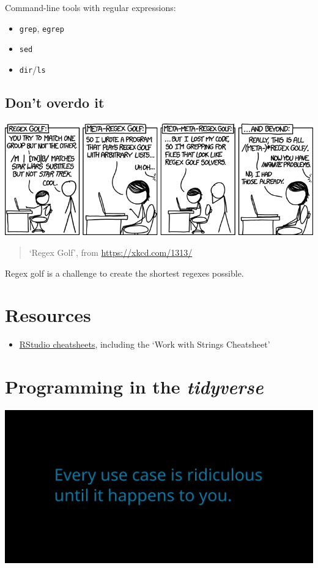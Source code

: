 \documentclass[]{book}
\providecommand{\tightlist}{%
  \setlength{\itemsep}{0pt}\setlength{\parskip}{0pt}}
\begin{document}
Command-line tools with regular expressions:

\begin{itemize}
\tightlist
\item
  \texttt{grep}, \texttt{egrep}
\item
  \texttt{sed}
\item
  \texttt{dir}/\texttt{ls}
\end{itemize}

\hypertarget{dont-overdo-it}{%
\section{Don't overdo it}\label{dont-overdo-it}}

\includegraphics{06_regex_golf.png}

\begin{quote}
`Regex Golf', from \url{https://xkcd.com/1313/}
\end{quote}

Regex golf is a challenge to create the shortest regexes possible.

\hypertarget{resources}{%
\chapter{Resources}\label{resources}}

\begin{itemize}
\tightlist
\item
  \href{https://rstudio.com/resources/cheatsheets/}{RStudio cheatsheets},
  including the `Work with Strings Cheatsheet'
\end{itemize}

\hypertarget{programming-in-the-tidyverse}{%
\chapter{\texorpdfstring{Programming in the \emph{tidyverse}}{Programming in the tidyverse}}\label{programming-in-the-tidyverse}}

\includegraphics{opening-image.png}
\end{document}

